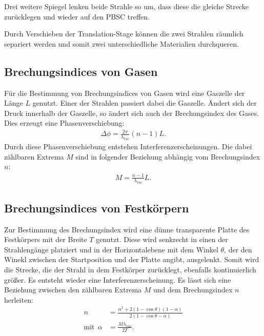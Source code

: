 Drei weitere Spiegel lenken beide Strahle so um, dass diese die gleiche Strecke zurücklegen und wieder auf
den PBSC treffen.

Durch Verschieben der Translation-Stage können die zwei Strahlen räumlich separiert
werden und somit zwei unterschiedliche Materialien durchqueren.

\FloatBarrier

\subsection{Brechungsindices von Gasen}
Für die Bestimmung von Brechungsindices von Gasen wird eine Gaszelle
der Länge $L$ genutzt. Einer der Strahlen passiert dabei die Gaszelle.
Ändert sich der Druck innerhalb der Gaszelle, so ändert sich auch
der Brechungsindex des Gases. Dies erzeugt eine Phasenverschiebung:
\begin{align}
  \Delta\phi=\frac{2\pi}{\lambda_\mathrm{vac}}(n-1)L.
\end{align}
Durch diese Phasenverschiebung entstehen Interferenzerscheinungen.
Die dabei zählbaren Extrema $M$ sind in folgender Beziehung abhängig
vom Brechungsindex $n$:
\begin{align}
  M=\frac{n-1}{\lambda_\mathrm{vac}}L\label{eqn:gas}.
\end{align}

\subsection{Brechungsindices von Festkörpern}
Zur Bestimmung des Brechungsindex wird eine dünne transparente
Platte des Festkörpers mit der Breite $T$ genutzt. Diese wird senkrecht in einen der Strahlengänge
platziert und in der Horizontalebene mit dem  Winkel $\theta$, der den Winekl zwischen der Startposition und der Platte angibt, ausgelenkt. Somit wird die
Strecke, die der Strahl in dem Festkörper zurücklegt, ebenfalls kontinuierlich größer.
Es entsteht wieder eine Interferenzerscheinung.
Es lässt sich eine Beziehung zwischen den zählbaren Extrema $M$
und dem Brechungsindex $n$ herleiten:
\begin{align}%
  n&=\frac{\alpha^2+2(1-\cos\theta)(1-\alpha)}{2(1-\cos\theta-\alpha)}\\
  \text{mit} \ \ \alpha&= \frac{M\lambda_\mathrm{vac}}{2T}. \label{eqn:glas}
\end{align}
